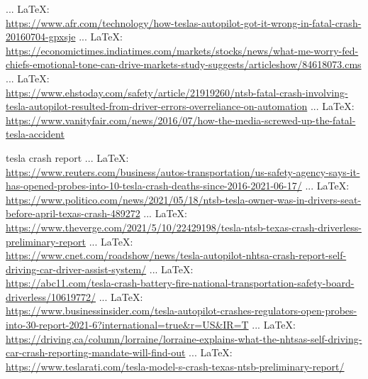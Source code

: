 \begin{thebibliography}{99}
{{{{{					 ... \LaTeX:\\ \url{https://www.afr.com/technology/how-teslas-autopilot-got-it-wrong-in-fatal-crash-20160704-gpxsje}
					 ... \LaTeX:\\ \url{https://economictimes.indiatimes.com/markets/stocks/news/what-me-worry-fed-chiefs-emotional-tone-can-drive-markets-study-suggests/articleshow/84618073.cms}
					 ... \LaTeX:\\ \url{https://www.ehstoday.com/safety/article/21919260/ntsb-fatal-crash-involving-tesla-autopilot-resulted-from-driver-errors-overreliance-on-automation}
					 ... \LaTeX:\\ \url{https://www.vanityfair.com/news/2016/07/how-the-media-screwed-up-the-fatal-tesla-accident}
					
					
					tesla crash report
					 ... \LaTeX:\\ \url{https://www.reuters.com/business/autos-transportation/us-safety-agency-says-it-has-opened-probes-into-10-tesla-crash-deaths-since-2016-2021-06-17/}
					 ... \LaTeX:\\ \url{https://www.politico.com/news/2021/05/18/ntsb-tesla-owner-was-in-drivers-seat-before-april-texas-crash-489272}
					 ... \LaTeX:\\ \url{https://www.theverge.com/2021/5/10/22429198/tesla-ntsb-texas-crash-driverless-preliminary-report}
					 ... \LaTeX:\\ \url{https://www.cnet.com/roadshow/news/tesla-autopilot-nhtsa-crash-report-self-driving-car-driver-assist-system/}
					 ... \LaTeX:\\ \url{https://abc11.com/tesla-crash-battery-fire-national-transportation-safety-board-driverless/10619772/}
					 ... \LaTeX:\\ \url{https://www.businessinsider.com/tesla-autopilot-crashes-regulators-open-probes-into-30-report-2021-6?international=true&r=US&IR=T}
					 ... \LaTeX:\\ \url{https://driving.ca/column/lorraine/lorraine-explains-what-the-nhtsas-self-driving-car-crash-reporting-mandate-will-find-out}
					 ... \LaTeX:\\ \url{https://www.teslarati.com/tesla-model-s-crash-texas-ntsb-preliminary-report/}
}}}}}
\end{thebibliography}
